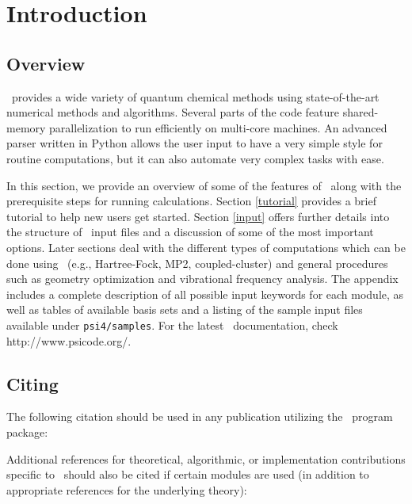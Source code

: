 \section{Introduction} \label{introduction}

\subsection{Overview} 

\PSIfour\ provides a wide variety of quantum chemical methods using
state-of-the-art numerical methods and algorithms.  Several parts of
the code feature shared-memory parallelization to run efficiently on
multi-core machines.  An advanced parser written in Python allows the user
input to have a very simple style for routine computations, but it can also
automate very complex tasks with ease. 

In this section, we provide an overview of
some of the features of \PSIfour\ along with the prerequisite steps for
running calculations.  Section \ref{tutorial} provides a brief tutorial to
help new users get started.  Section \ref{input} offers further details
into the structure of \PSIfour\ input files and a discussion of some of
the most important options.  Later sections deal with the different types
of computations which can be done using \PSIfour\ (e.g., Hartree-Fock,
MP2, coupled-cluster) and general procedures such as geometry optimization
and vibrational frequency analysis.  The appendix includes a complete
description of all possible input keywords for each module,
as well as tables of available basis sets and a listing of the sample input
files available under {\tt psi4/samples}.
For the latest \PSIfour\ documentation, check  {http://www.psicode.org/}.

\subsection{Citing \PSIfour}

The following citation should be used in any publication utilizing the
\PSIfour\ program package:

\begin{quotation}
\noindent

\end{quotation}

Additional references for theoretical, algorithmic, or implementation
contributions specific to \PSIfour\ should also be cited if certain
modules are used (in addition to appropriate references for the
underlying theory):

